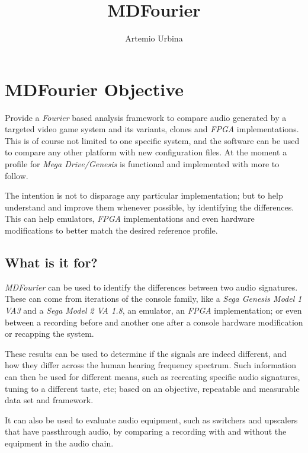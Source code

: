 \documentclass[10pt,a4paper]{report}
\title{MDFourier}
\author{Artemio Urbina}
\begin{document}
\begin{titlepage}
	\maketitle
	\thispagestyle{empty}
\end{titlepage}

\tableofcontents

\chapter{MDFourier Objective}

Provide a \textit{Fourier} based analysis framework to compare audio generated by a targeted video game system and its variants, clones and \textit{FPGA} implementations. This is of course not limited to one specific system, and the software can be used to compare any other platform with new configuration files. At the moment a profile for \textit{Mega Drive/Genesis} is functional and implemented with more to follow.

The intention is not to disparage any particular implementation; but to help understand and improve them whenever possible, by identifying the differences. This can help emulators, \textit{FPGA} implementations and even hardware modifications to better match the desired reference profile.

\section{What is it for?}

\textit{MDFourier} can be used to identify the differences between two audio signatures. These can come from iterations of the console family, like a \textit{Sega Genesis Model 1 VA3} and a \textit{Sega Model 2 VA 1.8}, an emulator, an \textit{FPGA} implementation; or even between a recording before and another one after a console hardware modification or recapping the system.

These results can be used to determine if the signals are indeed different, and how they differ across the human hearing frequency spectrum. Such information can then be used for different means, such as recreating specific audio signatures, tuning to a different taste, etc; based on an objective, repeatable and measurable data set and framework.

It can also be used to evaluate audio equipment, such as switchers and upscalers that have passthrough audio, by comparing a recording with and without the equipment in the audio chain.
\end{document}
